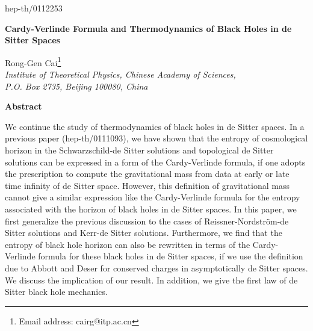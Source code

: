\documentclass[a4paper,12pt]{article}
\begin{document}
\topmargin 0pt
\oddsidemargin 0mm

\renewcommand{\thefootnote}{\fnsymbol{footnote}}
\begin{titlepage}
\begin{flushright}
hep-th/0112253
\end{flushright}

\vspace{5mm}
\begin{center}
{\Large \bf Cardy-Verlinde Formula and Thermodynamics of Black Holes in de
 Sitter Spaces}
\vspace{12mm}

{\large
Rong-Gen Cai\footnote{Email address: cairg@itp.ac.cn}\\
\vspace{8mm}
{ \em Institute of Theoretical Physics, Chinese Academy of Sciences, \\
   P.O. Box 2735, Beijing 100080, China}} 
\end{center}
\vspace{5mm}
\centerline{{\bf{Abstract}}}
\vspace{5mm}
We continue the study of thermodynamics of black holes in de Sitter spaces. In a previous
paper (hep-th/0111093), we have shown that the entropy of cosmological horizon in the 
Schwarzschild-de Sitter solutions and topological de Sitter solutions can be expressed in
a form of the Cardy-Verlinde formula, if one adopts the prescription to compute the 
gravitational mass from data at early or late time infinity of de Sitter space. However,
this definition of gravitational mass cannot give a similar expression like the 
Cardy-Verlinde formula for the entropy associated with the horizon of black holes in de 
Sitter spaces. In this paper, we first generalize the previous discussion to the cases of  
Reissner-Nordstr\"om-de Sitter solutions and Kerr-de Sitter solutions. Furthermore, we find that
the entropy of black hole horizon can also be rewritten in terms of the Cardy-Verlinde
formula for these black holes in de Sitter spaces, if we use the definition due to Abbott and
Deser for conserved charges in asymptotically de Sitter spaces. We discuss the 
implication of our result. In addition, we give the first law of de Sitter black hole 
mechanics.

\end{titlepage}

\newpage
\renewcommand{\thefootnote}{\arabic{footnote}}
\setcounter{footnote}{0}
\setcounter{page}{2}
\end{document}
